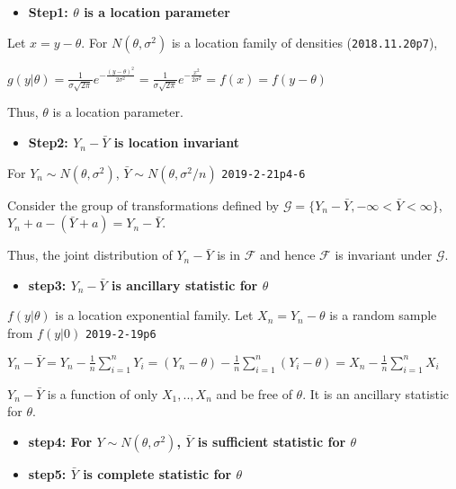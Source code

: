 \documentclass[12pt,]{article}
\providecommand{\tightlist}{%
  \setlength{\itemsep}{0pt}\setlength{\parskip}{0pt}}
\begin{document}
\begin{itemize}
\tightlist
\item
  \textbf{Step1: \(\theta\) is a location parameter}
\end{itemize}

Let \(x=y-\theta\). For \(N(\theta,\sigma^2)\) is a location family of
densities (\texttt{2018.11.20p7}),

\(g(y|\theta)=\frac1{\sigma\sqrt{2\pi}}e^{-\frac{(y-\theta)^2}{2\sigma^2}}=\frac1{\sigma\sqrt{2\pi}}e^{-\frac{x^2}{2\sigma^2}}=f(x)=f(y-\theta)\)

Thus, \(\theta\) is a location parameter.

\begin{itemize}
\tightlist
\item
  \textbf{Step2: \(Y_n-\bar Y\) is location invariant}
\end{itemize}

For \(Y_n\sim N(\theta,\sigma^2)\), \(\bar Y\sim N(\theta,\sigma^2/n)\)
\texttt{2019-2-21p4-6}

Consider the group of transformations defined by
\(\mathcal{G}=\{Y_n-\bar Y,-\infty<\bar Y<\infty\}\),
\(Y_n+a-(\bar Y+a)=Y_n-\bar Y\).

Thus, the joint distribution of \(Y_n-\bar Y\) is in \(\mathcal{F}\) and
hence \(\mathcal{F}\) is invariant under \(\mathcal{G}\).

\begin{itemize}
\tightlist
\item
  \textbf{step3: \(Y_n-\bar Y\) is ancillary statistic for \(\theta\)}
\end{itemize}

\(f(y|\theta)\) is a location exponential family. Let \(X_n=Y_n-\theta\)
is a random sample from \(f(y|0)\) \texttt{2019-2-19p6}

\(Y_n-\bar Y=Y_n-\frac1{n}\sum_{i=1}^nY_i=(Y_n-\theta)-\frac1{n}\sum_{i=1}^n(Y_i-\theta)= X_n-\frac1{n}\sum_{i=1}^nX_i\)

\(Y_n-\bar Y\) is a function of only \(X_1,..,X_n\) and be free of
\(\theta\). It is an ancillary statistic for \(\theta\).

\begin{itemize}
\item
  \textbf{step4: For \(Y\sim N(\theta,\sigma^2)\), \(\bar Y\) is
  sufficient statistic for \(\theta\)}
\item
  \textbf{step5: \(\bar Y\) is complete statistic for \(\theta\)}
\end{itemize}
\end{document}
